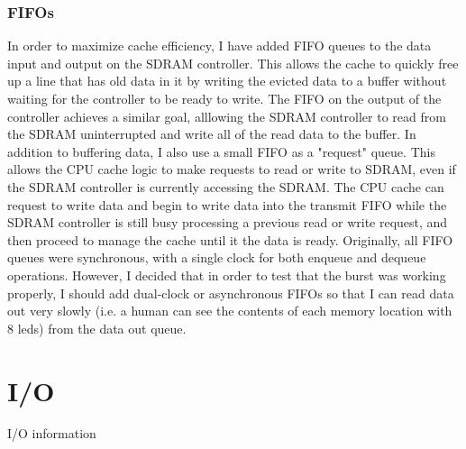 \documentclass{article}
\begin{document}
\newpage

\subsubsection{FIFOs}
In order to maximize cache efficiency, I have added FIFO queues to the data input and output on the SDRAM controller. This allows the cache to quickly free up a line that has old data in it by writing the evicted data to a buffer without waiting for the controller to be ready to write. The FIFO on the output of the controller achieves a similar goal, alllowing the SDRAM controller to read from the SDRAM uninterrupted and write all of the read data to the buffer. In addition to buffering data, I also use a small FIFO as a "request" queue. This allows the CPU cache logic to make requests to read or write to SDRAM, even if the SDRAM controller is currently accessing the SDRAM. The CPU cache can request to write data and begin to write data into the transmit FIFO while the SDRAM controller is still busy processing a previous read or write request, and then proceed to manage the cache until it the data is ready. Originally, all FIFO queues were synchronous, with a single clock for both enqueue and dequeue operations. However, I decided that in order to test that the burst was working properly, I should add dual-clock or asynchronous FIFOs so that I can read data out very slowly (i.e. a human can see the contents of each memory location with 8 leds) from the data out queue.

\newpage

\section{I/O}
I/O information
\end{document}
